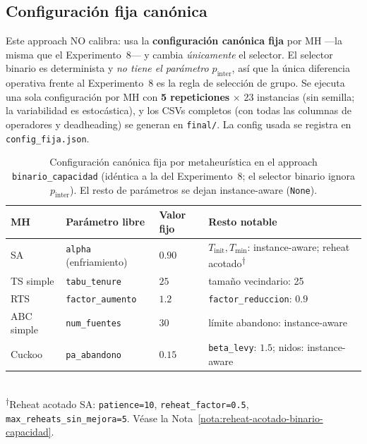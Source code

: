 \subsection{Configuración fija canónica}
\label{subsec:config-fija-binario-capacidad}

Este approach NO calibra: usa la \textbf{configuración canónica fija} por
MH ---la misma que el Experimento~8--- y cambia \emph{únicamente} el
selector. El selector binario es determinista y \emph{no tiene el
parámetro $p_{\text{inter}}$}, así que la única diferencia operativa frente
al Experimento~8 es la regla de selección de grupo. Se ejecuta una sola
configuración por MH con \textbf{5 repeticiones} $\times$ 23 instancias
(sin semilla; la variabilidad es estocástica), y los CSVs completos (con
todas las columnas de operadores y deadheading) se generan en
\texttt{final/}. La config usada se registra en \texttt{config\_fija.json}.

\begin{table}[h]
\centering
\caption{Configuración canónica fija por metaheurística en el approach
         \texttt{binario\_capacidad} (idéntica a la del Experimento~8; el
         selector binario ignora $p_{\text{inter}}$). El resto de
         parámetros se dejan instance-aware (\texttt{None}).}
\label{tab:grid-binario-capacidad}
\small
\begin{tabular}{llll}
\toprule
MH & Parámetro libre & Valor fijo & Resto notable \\
\midrule
SA           & \texttt{alpha} (enfriamiento)   & $0.90$  &
  $T_{\text{init}}, T_{\min}$: instance-aware; reheat acotado\textsuperscript{†} \\
TS simple    & \texttt{tabu\_tenure}            & $25$    &
  tamaño vecindario: 25 \\
RTS          & \texttt{factor\_aumento}         & $1.2$   &
  \texttt{factor\_reduccion}: $0.9$ \\
ABC simple   & \texttt{num\_fuentes}            & $30$    &
  límite abandono: instance-aware \\
Cuckoo       & \texttt{pa\_abandono}            & $0.15$  &
  \texttt{beta\_levy}: $1.5$; nidos: instance-aware \\
\bottomrule
\end{tabular}
\\[4pt]
\footnotesize
\textsuperscript{†}Reheat acotado SA: \texttt{patience=10},
\texttt{reheat\_factor=0.5}, \texttt{max\_reheats\_sin\_mejora=5}.
Véase la Nota~\ref{nota:reheat-acotado-binario-capacidad}.
\end{table}

